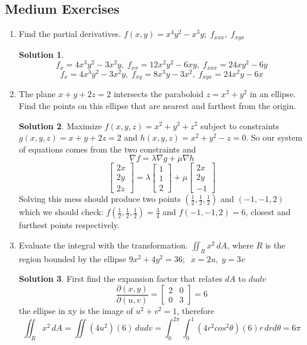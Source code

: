 \documentclass[]{book}
\theoremstyle{definition}
\newtheorem*{soln}{Solution}
\begin{document}
\subsection*{Medium Exercises}
\begin{enumerate}

\item	Find the partial derivatives. $f(x,y)=x^4y^2-x^3y;\;f_{xxx},\;f_{xyx}$ 
\begin{soln}
    $$f_x=4x^3y^2-3x^2y,\;f_{xx}=12x^2y^2-6xy,\;f_{xxx}=24xy^2-6y$$
    $$f_x=4x^3y^2-3x^2y,\;f_{xy}=8x^3y-3x^2,\;f_{xyx}=24x^2y-6x$$
\end{soln}

\item   The plane $x+y+2z=2$ intersects the paraboloid $z=x^2+y^2$ in an ellipse. Find the points on this ellipse that are nearest and farthest from the origin. 
\begin{soln}
    Maximize $f(x,y,z)=x^2+y^2+z^2$ subject to constraints $g(x,y,z)=x+y+2z=2$ and $h(x,y,z)=x^2+y^2-z=0$. So our system of equations comes from the two constraints and
    $$\nabla f = \lambda \nabla g + \mu \nabla h$$
    $$\begin{bmatrix} 2x \\ 2y \\ 2z \end{bmatrix} = \lambda \begin{bmatrix} 1 \\ 1 \\ 2 \end{bmatrix} + \mu \begin{bmatrix} 2x \\ 2y \\ -1 \end{bmatrix}$$
    Solving this mess should produce two points $(\frac{1}{2},\frac{1}{2},\frac{1}{2})$ and $(-1,-1,2)$ which we should check: $f(\frac{1}{2},\frac{1}{2},\frac{1}{2})=\frac{3}{4}$ and $f(-1,-1,2)=6$, closest and furthest points respectively.
\end{soln}

\item   Evaluate the integral with the transformation. $\iint_{R}x^2\,dA$, where $R$ is the region bounded by the ellipse $9x^2+4y^2=36;\;\;x=2u,\;y=3v$
\begin{soln}
    First find the expansion factor that relates $dA$ to $dudv$
    $$\frac{\partial (x,y)}{\partial (u,v)}=\begin{bmatrix} 2 & 0 \\ 0 & 3 \end{bmatrix}=6$$
    the ellipse in xy is the image of $u^2+v^2 = 1$, therefore
    $$\iint_{R}x^2\,dA=\iint (4u^2)(6)\,dudv=\int_{0}^{2\pi}\int_{0}^{1}(4r^2cos^2\theta)(6)r\,drd\theta=6\pi$$
\end{soln}
\end{enumerate}
\end{document}
